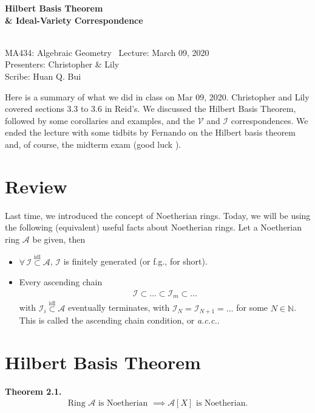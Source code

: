 \documentclass[12pt]{article}
\begin{document}
\begin{center}
	\LARGE{\textbf{Hilbert Basis Theorem \\\& Ideal-Variety Correspondence}}
	
	
	\noindent \hrulefill\\
	\small{MA434: Algebraic Geometry \textemdash$\,$  Lecture: March 09, 2020}\\
	\small{Presenters: Christopher \& Lily} \\
	\small{Scribe: Huan Q. Bui}\\\vspace{-6pt}
	\hrulefill
\end{center}

Here is a summary of what we did in class on Mar 09, 2020. Christopher and Lily covered sections 3.3 to 3.6 in Reid's. We discussed the Hilbert Basis Theorem, followed by some corollaries and examples, and the $\mathcal{V}$ and $\mathcal{I}$ correspondences. We ended the lecture with some tidbits by Fernando on the Hilbert basis theorem and, of course, the midterm exam (good luck \smiley{}). 


\section{Review}

Last time, we introduced the concept of Noetherian rings. Today, we will be using the following (equivalent) useful facts about Noetherian rings. Let a Noetherian ring $\mathcal{A}$ be given, then
\begin{itemize}
	\item $\forall\,\mathcal{I} \overset{\text{idl}}{\subset} \mathcal{A}$, $\mathcal{I}$ is finitely generated (or f.g., for short). 
	\item Every ascending chain 
	\begin{align*}
	\mathcal{I} \subset \dots \subset \mathcal{I}_m \subset \dots
	\end{align*}
	with $\mathcal{I}_i \overset{\text{idl}}{\subset}\mathcal{A}$ eventually terminates, with $\mathcal{I}_N = \mathcal{I}_{N+1} = \dots$ for some $N \in \mathbb{N}$. This is called the ascending chain condition, or \textit{a.c.c.}.
\end{itemize} 


\section{Hilbert Basis Theorem}

\textbf{Theorem 2.1.}
	\begin{align*}
	\boxed{\text{Ring } \mathcal{A} \text{ is Noetherian } \implies \mathcal{A}[X] \text{ is Noetherian.}}
	\end{align*}
\end{document}

